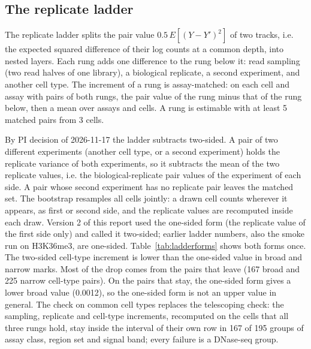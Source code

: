 \documentclass[pdflatex,sn-mathphys-num]{sn-jnl}
\newcommand{\lit}[1]{#1}
\newcommand{\cl}[1]{#1}
\newcommand{\ladBrCtLeft}{167}
\newcommand{\ladCcN}{195}
\newcommand{\ladCcOk}{167}
\newcommand{\ladKeptBrOne}{0.0012}
\newcommand{\ladNrCtLeft}{225}
\newcommand{\minPairs}{5}
\begin{document}
\subsection{The replicate ladder}

\cl{The replicate ladder splits the pair value $\lit{0.5}\,E[(Y-Y')^{\lit{2}}]$ of two tracks, i.e. the expected squared difference of their log counts at a common depth, into nested layers. Each rung adds one difference to the rung below it: read sampling (two read halves of one library), a biological replicate, a second experiment, and another cell type. The increment of a rung is assay-matched: on each cell and assay with pairs of both rungs, the pair value of the rung minus that of the rung below, then a mean over assays and cells. A rung is estimable with at least \minPairs{} matched pairs from \lit{3} cells.}

\cl{By PI decision of \lit{2026-11-17} the ladder subtracts two-sided. A pair of two different experiments (another cell type, or a second experiment) holds the replicate variance of both experiments, so it subtracts the mean of the two replicate values, i.e. the biological-replicate pair values of the experiment of each side. A pair whose second experiment has no replicate pair leaves the matched set. The bootstrap resamples all cells jointly: a drawn cell counts wherever it appears, as first or second side, and the replicate values are recomputed inside each draw. Version \lit{2} of this report used the one-sided form (the replicate value of the first side only) and called it two-sided; earlier ladder numbers, also the smoke run on \lit{H3K36me3}, are one-sided. Table~\ref{tab:ladderforms} shows both forms once. The two-sided cell-type increment is lower than the one-sided value in broad and narrow marks. Most of the drop comes from the pairs that leave (\ladBrCtLeft{} broad and \ladNrCtLeft{} narrow cell-type pairs). On the pairs that stay, the one-sided form gives a lower broad value (\ladKeptBrOne{}), so the one-sided form is not an upper value in general. The check on common cell types replaces the telescoping check: the sampling, replicate and cell-type increments, recomputed on the cells that all three rungs hold, stay inside the interval of their own row in \ladCcOk{} of \ladCcN{} groups of assay class, region set and signal band; every failure is a DNase-seq group.}
\end{document}
